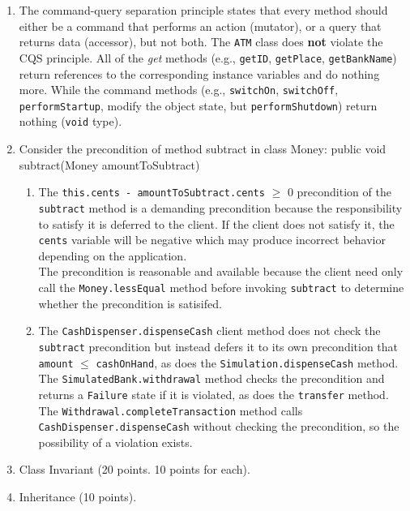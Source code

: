 \documentclass{report}
\begin{document}
\begin{enumerate}
	\item The command-query separation principle states that every method should either be a command that performs an action
	(mutator), or a query that returns data (accessor), but not both. The \texttt{ATM} class does \textbf{not} violate the CQS principle.
	All of the \textit{get} methods (e.g., \texttt{getID},
	\texttt{getPlace}, \texttt{getBankName}) return references to the
	corresponding instance variables and do nothing more. While the
    command	methods (e.g., \texttt{switchOn}, \texttt{switchOff},
	\texttt{performStartup}, modify the object state, but \texttt{performShutdown}) return nothing (\texttt{void} type).
		
	\item Consider the precondition of method subtract in class Money:
	public void subtract(Money amountToSubtract)
	\begin{enumerate}
	    \item The \texttt{this.cents - amountToSubtract.cents} $\geq$ 0 precondition of the \texttt{subtract} method
	    is a demanding precondition because the responsibility
	    to satisfy it is deferred to the client. If the client
	    does not satisfy it, the \texttt{cents} variable will
	    be negative which may produce incorrect behavior
	    depending on the application.\\
	    The precondition is reasonable and available because
	    the client need only call the \texttt{Money.lessEqual}
	    method before invoking \texttt{subtract} to determine
	    whether the precondition is satisifed.
	    
	    \item The \texttt{CashDispenser.dispenseCash} client
	    method does not check the \texttt{subtract} precondition
	    but instead defers it to its own precondition that
	    \texttt{amount} $\leq$ \texttt{cashOnHand}, as does
	    the \texttt{Simulation.dispenseCash} method. The
	    \texttt{SimulatedBank.withdrawal} method checks the
	    precondition and returns a \texttt{Failure} state if
	    it is violated, as does the \texttt{transfer} method.
	    The \texttt{Withdrawal.completeTransaction} method calls
	    \texttt{CashDispenser.dispenseCash} without checking
	    the precondition, so the possibility of a violation
	    exists.
	\end{enumerate}
	
	\item Class Invariant  (20 points. 10 points for each).
	
    \item Inheritance (10 points).

\end{enumerate}
\end{document}
